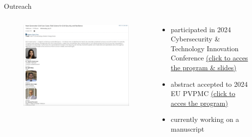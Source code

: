 \documentclass[aspectratio=169,11pt]{beamer}
\begin{document}
\begin{frame}{Outreach}
\begin{columns}
    \begin{column}{0.6\textwidth}
        \begin{figure}
            \centering
            \includegraphics[width=\columnwidth]{./figures/cybercon_program.png}
        \end{figure}
    \end{column}
    \begin{column}{0.4\textwidth}
        \begin{itemize}
            \item participated in 2024 Cybersecurity \& Technology Innovation Conference
            \href{https://www.doecybercon.com/Program/Agenda}{(click to acces the program \& slides)}
            \item abstract accepted to 2024 EU PVPMC
            \href{https://www.sandia.gov/app/uploads/sites/243/dlm_uploads/2024/08/2024-European-PVPMC-Program-V9.pdf}{(click to acces the program)}
            \item currently working on a manuscript
        \end{itemize}
    \end{column}
\end{columns}
\end{frame}
    


	
\end{document}
